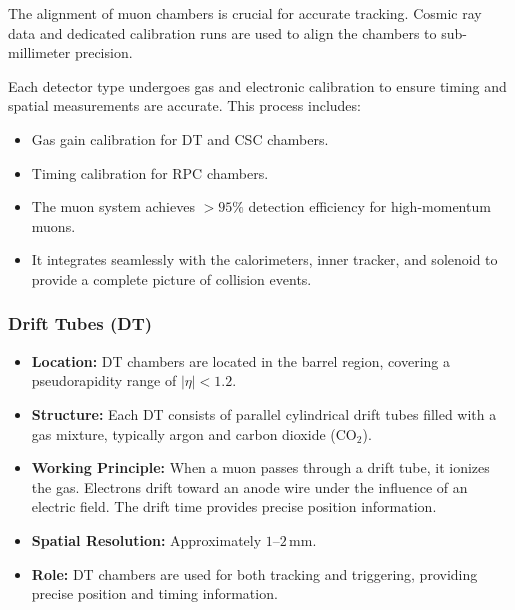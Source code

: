 The alignment of muon chambers is crucial for accurate tracking. Cosmic ray data and dedicated calibration runs are used to align the chambers to sub-millimeter precision.

Each detector type undergoes gas and electronic calibration to ensure timing and spatial measurements are accurate. This process includes:
\begin{itemize}
	\item Gas gain calibration for DT and CSC chambers.
	\item Timing calibration for RPC chambers.
\end{itemize}

\begin{itemize}
	\item The muon system achieves $>95\%$ detection efficiency for high-momentum muons.
	\item It integrates seamlessly with the calorimeters, inner tracker, and solenoid to provide a complete picture of collision events.
\end{itemize}

\subsubsection{Drift Tubes (DT)}
\begin{itemize}
	\item \textbf{Location:} DT chambers are located in the barrel region, covering a pseudorapidity range of $|\eta| < 1.2$.
	\item \textbf{Structure:} Each DT consists of parallel cylindrical drift tubes filled with a gas mixture, typically argon and carbon dioxide (CO$_2$).
	\item \textbf{Working Principle:} When a muon passes through a drift tube, it ionizes the gas. Electrons drift toward an anode wire under the influence of an electric field. The drift time provides precise position information.
	\item \textbf{Spatial Resolution:} Approximately $1$--$2\,\mathrm{mm}$.
	\item \textbf{Role:} DT chambers are used for both tracking and triggering, providing precise position and timing information.
\end{itemize}

